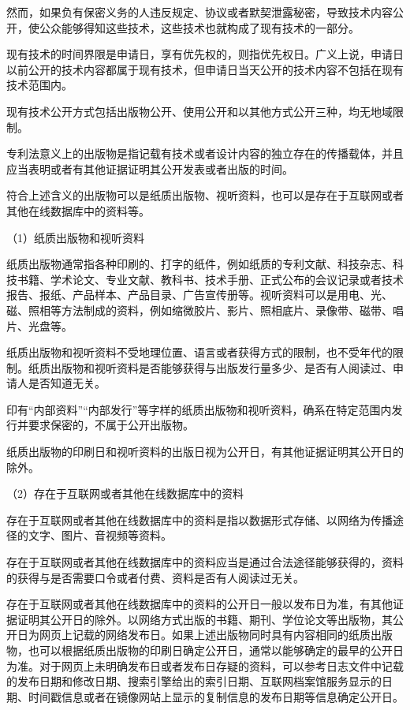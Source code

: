 然而，如果负有保密义务的人违反规定、协议或者默契泄露秘密，导致技术内容公开，使公众能够得知这些技术，这些技术也就构成了现有技术的一部分。

现有技术的时间界限是申请日，享有优先权的，则指优先权日。广义上说，申请日以前公开的技术内容都属于现有技术，但申请日当天公开的技术内容不包括在现有技术范围内。

现有技术公开方式包括出版物公开、使用公开和以其他方式公开三种，均无地域限制。

专利法意义上的出版物是指记载有技术或者设计内容的独立存在的传播载体，并且应当表明或者有其他证据证明其公开发表或者出版的时间。

符合上述含义的出版物可以是纸质出版物、视听资料，也可以是存在于互联网或者其他在线数据库中的资料等。

{\setlength{\parindent}{17.1bp}（1）纸质出版物和视听资料\par}

纸质出版物通常指各种印刷的、打字的纸件，例如纸质的专利文献、科技杂志、科技书籍、学术论文、专业文献、教科书、技术手册、正式公布的会议记录或者技术报告、报纸、产品样本、产品目录、广告宣传册等。视听资料可以是用电、光、磁、照相等方法制成的资料，例如缩微胶片、影片、照相底片、录像带、磁带、唱片、光盘等。

纸质出版物和视听资料不受地理位置、语言或者获得方式的限制，也不受年代的限制。纸质出版物和视听资料是否能够获得与出版发行量多少、是否有人阅读过、申请人是否知道无关。

印有“内部资料”“内部发行”等字样的纸质出版物和视听资料，确系在特定范围内发行并要求保密的，不属于公开出版物。

纸质出版物的印刷日和视听资料的出版日视为公开日，有其他证据证明其公开日的除外。

{\setlength{\parindent}{17.1bp}（2）存在于互联网或者其他在线数据库中的资料\par}

存在于互联网或者其他在线数据库中的资料是指以数据形式存储、以网络为传播途径的文字、图片、音视频等资料。

存在于互联网或者其他在线数据库中的资料应当是通过合法途径能够获得的，资料的获得与是否需要口令或者付费、资料是否有人阅读过无关。

存在于互联网或者其他在线数据库中的资料的公开日一般以发布日为准，有其他证据证明其公开日的除外。以网络方式出版的书籍、期刊、学位论文等出版物，其公开日为网页上记载的网络发布日。如果上述出版物同时具有内容相同的纸质出版物，也可以根据纸质出版物的印刷日确定公开日，通常以能够确定的最早的公开日为准。对于网页上未明确发布日或者发布日存疑的资料，可以参考日志文件中记载的发布日期和修改日期、搜索引擎给出的索引日期、互联网档案馆服务显示的日期、时间戳信息或者在镜像网站上显示的复制信息的发布日期等信息确定公开日。

